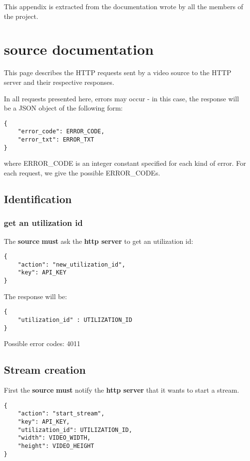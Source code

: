 This appendix is extracted from the documentation wrote by all the members of
the \claude project.

\section*{source documentation}

This page describes the H\-T\-T\-P requests sent by a video source to the H\-T\-T\-P server and their respective responses.

In all requests presented here, errors may occur -\/ in this case, the response
will be a J\-S\-O\-N object of the following form\-: \begin{verbatim}{
    "error_code": ERROR_CODE,
    "error_txt": ERROR_TXT
}
\end{verbatim}


where E\-R\-R\-O\-R\-\_\-\-C\-O\-D\-E is an integer constant specified for each kind of error. For each request, we give the possible E\-R\-R\-O\-R\-\_\-\-C\-O\-D\-Es.

\subsection*{Identification }

\subsubsection*{get an utilization id}

The {\bfseries source} {\bfseries must} ask the {\bfseries http server} to get an utilization id\-: \begin{verbatim}{
    "action": "new_utilization_id",
    "key": API_KEY
}
\end{verbatim}


The response will be\-: \begin{verbatim}{
    "utilization_id" : UTILIZATION_ID
}
\end{verbatim}


Possible error codes\-: 4011

\subsection*{Stream creation }

First the {\bfseries source} {\bfseries must} notify the {\bfseries http server} that it wants to start a stream. \begin{verbatim}{
    "action": "start_stream",
    "key": API_KEY,
    "utilization_id": UTILIZATION_ID,
    "width": VIDEO_WIDTH,
    "height": VIDEO_HEIGHT
}
\end{verbatim}


